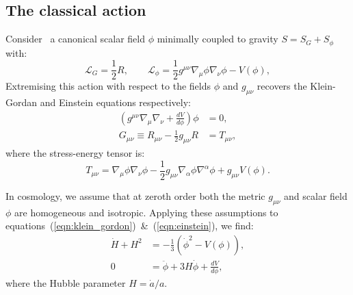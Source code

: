 \subsection{The classical action}
\label{sec:inflation}
Consider~\cite{Baumann+2009} a canonical scalar field $\phi$ minimally coupled to gravity $S= S_G + S_\phi$ with:
\begin{equation}
  \mathcal{L}_G = \frac{1}{2}R, 
  \qquad
  \mathcal{L}_\phi = \frac{1}{2}g^{\mu\nu}\nabla_\mu\phi\nabla_\nu\phi - V(\phi),
  \label{eqn:action}
\end{equation}
Extremising this action with respect to the fields $\phi$ and $g_{\mu\nu}$ recovers the Klein-Gordan and Einstein equations respectively:
\begin{align}
  \left( g^{\mu\nu}\nabla_\mu\nabla_\nu + \frac{dV}{d\phi} \right) \phi &= 0,
  \label{eqn:klein_gordon}\\
  G_{\mu\nu}\equiv R_{\mu\nu}-\frac{1}{2}g_{\mu\nu}R&= T_{\mu\nu},
  \label{eqn:einstein}
\end{align}
where the stress-energy tensor is:
\begin{equation}
  T_{\mu\nu} = \nabla_\mu\phi \nabla_\nu\phi - \frac{1}{2}g_{\mu\nu} \nabla_\alpha\phi \nabla^\alpha\phi +g_{\mu\nu} V(\phi).
  \label{eqn:SET}
\end{equation}

In cosmology, we assume that at zeroth order both the metric $g_{\mu\nu}$ and scalar field $\phi$ are homogeneous and isotropic. Applying these assumptions to equations~(\ref{eqn:klein_gordon})~\&~(\ref{eqn:einstein}), we find:
\begin{align}
  \dot{H}+H^2 &= -\frac{1}{3}\left( \dot{\phi}^2 - V(\phi) \right),
  \label{eqn:Raychaudhuri}\\
  0&=\ddot{\phi} + 3H\dot{\phi} + \frac{dV}{d\phi},
\end{align}
where the Hubble parameter $H = \dot{a}/a$.
